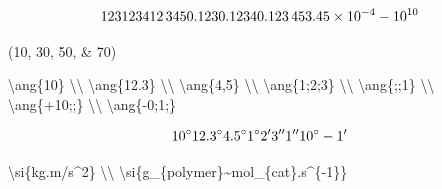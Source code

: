 \documentclass{book}
\newenvironment{Shaded}{}{}
\newcommand{\FunctionTok}[1]{\textcolor[rgb]{0.02,0.16,0.49}{#1}}
\newcommand{\NormalTok}[1]{#1}
\newcommand{\SpecialCharTok}[1]{\textcolor[rgb]{0.25,0.44,0.63}{#1}}
\newcommand{\SpecialStringTok}[1]{\textcolor[rgb]{0.73,0.40,0.53}{#1}}
\begin{document}
\[
  \num{123}     \\
  \num{1234}    \\
  \num{12345}   \\
  \num{0.123}   \\
  \num{0,1234}  \\
  \num{.12345}  \\
  \num{3.45d-4} \\
  \num{-e10}
\]

\begin{Shaded}
\end{Shaded}

(\numlist{10;30;50;70})

\begin{Shaded}
\begin{Highlighting}[]
  \FunctionTok{\textbackslash{}ang}\NormalTok{\{10\}    }\FunctionTok{\textbackslash{}\textbackslash{}}
  \FunctionTok{\textbackslash{}ang}\NormalTok{\{12.3\}  }\FunctionTok{\textbackslash{}\textbackslash{}}
  \FunctionTok{\textbackslash{}ang}\NormalTok{\{4,5\}   }\FunctionTok{\textbackslash{}\textbackslash{}}
  \FunctionTok{\textbackslash{}ang}\NormalTok{\{1;2;3\} }\FunctionTok{\textbackslash{}\textbackslash{}}
  \FunctionTok{\textbackslash{}ang}\NormalTok{\{;;1\}   }\FunctionTok{\textbackslash{}\textbackslash{}}
  \FunctionTok{\textbackslash{}ang}\NormalTok{\{+10;;\} }\FunctionTok{\textbackslash{}\textbackslash{}}
  \FunctionTok{\textbackslash{}ang}\NormalTok{\{{-}0;1;\}}
\end{Highlighting}
\end{Shaded}

\[
  \ang{10}    \\
  \ang{12.3}  \\
  \ang{4,5}   \\
  \ang{1;2;3} \\
  \ang{;;1}   \\
  \ang{+10;;} \\
  \ang{-0;1;}
\]

\begin{Shaded}
\begin{Highlighting}[]
  \FunctionTok{\textbackslash{}si}\NormalTok{\{kg.m/s\^{}2\} }\FunctionTok{\textbackslash{}\textbackslash{}}
  \FunctionTok{\textbackslash{}si}\NormalTok{\{g\_\{polymer\}\textasciitilde{}mol\_\{cat\}.s\^{}\{{-}1\}\}}
\end{Highlighting}
\end{Shaded}
\end{document}
